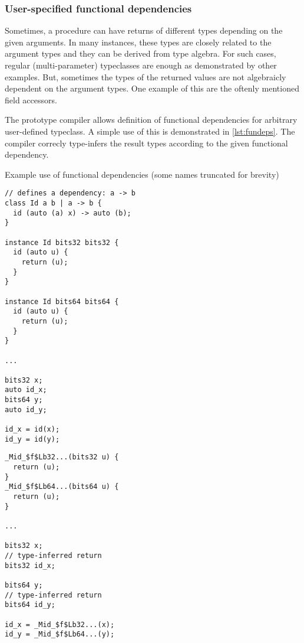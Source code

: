 \subsubsection{User-specified functional dependencies}

Sometimes, a procedure can have returns of different types depending on the given arguments. In many instances, these types are closely related to the argument types and they can be derived from type algebra. For such cases, regular (multi-parameter) typeclasses are enough as demonstrated by other examples. But, sometimes the types of the returned values are not algebraicly dependent on the argument types. One example of this are the oftenly mentioned field accessors.

The prototype compiler allows definition of functional dependencies for arbitrary user-defined typeclass. A simple use of this is demonstrated in \cref{lst:fundeps}. The compiler correcly type-infers the result types according to the given functional dependency.

\begin{listing}
    \caption{Example use of functional dependencies (some names truncated for brevity)}
    \label{lst:fundeps}
    \begin{center}
    \begin{minipage}{0.5\linewidth}
    \begin{lstlisting}
// defines a dependency: a -> b
class Id a b | a -> b {
  id (auto (a) x) -> auto (b);
}

instance Id bits32 bits32 {
  id (auto u) {
    return (u);
  }
}

instance Id bits64 bits64 {
  id (auto u) {
    return (u);
  }
}

...

bits32 x;
auto id_x;
bits64 y;
auto id_y;

id_x = id(x);
id_y = id(y);
    \end{lstlisting}
    \end{minipage}%
    \begin{minipage}{0.5\linewidth}
    \begin{lstlisting}
_Mid_$f$Lb32...(bits32 u) {
  return (u);
}
_Mid_$f$Lb64...(bits64 u) {
  return (u);
}

...

bits32 x;
// type-inferred return
bits32 id_x;

bits64 y;
// type-inferred return
bits64 id_y;

id_x = _Mid_$f$Lb32...(x);
id_y = _Mid_$f$Lb64...(y);
    \end{lstlisting}
    \end{minipage}
    \end{center}
\end{listing}

